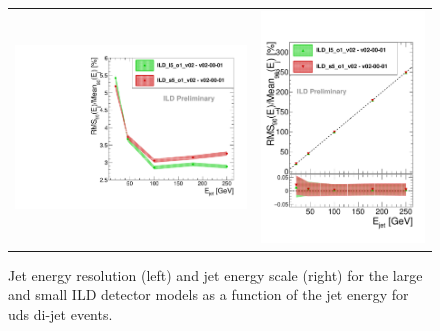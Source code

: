 %
% 
\begin{figure}[b!]
\begin{tabular}{cc}
\includegraphics[width=0.5\hsize]{Performance/fig/JERLargeSmall_v02-00-01.pdf} &
\includegraphics[width=0.5\hsize]{Performance/fig/JESLargeSmall_v02-00-01.pdf}
\end{tabular}
\caption{\label{ild:fig:intro:tracking} Jet energy resolution (left) and jet energy scale (right) for the large and small ILD detector
models as a function of the jet energy for uds di-jet events.}
 \end{figure}


